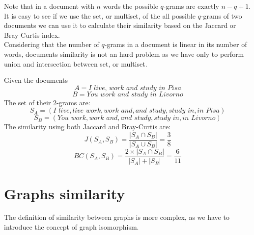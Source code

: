 Note that in a document with $n$ words the possible $q$-grams are exactly $n-q+1$.\\

It is easy to see if we use the set, or multiset, of the all possible $q$-grams of two documents we can use it to calculate their similarity based on the Jaccard or Bray-Curtis index.\\

Considering that the number of $q$-grams in a document is linear in its number of words, documents similarity is not an hard problem as we have only to perform union and intersection between set, or multiset.

\begin{esempio}
	Given the documents 
	\begin{equation*}
	A = \textit{I live, work and study in Pisa}
	\end{equation*}
	\begin{equation*}
	B = \textit{You work and study in Livorno}
	\end{equation*}
	The set of their $2$-grams are:
	\begin{equation*}
	S_{A} = (\textit{I live}, \textit{live work}, \textit{work and}, \textit{and study}, \textit{study in}, \textit{in Pisa})
	\end{equation*}
	\begin{equation*}
	S_{B} = (\textit{You work}, \textit{work and}, \textit{and study}, \textit{study in}, \textit{in Livorno})
	\end{equation*}
	The similarity using both Jaccard and Bray-Curtis are:\\
	\begin{equation*}
		J(S_{A},S_{B}) = \frac{|S_{A} \cap S_{B} |}{|S_{A} \cup S_{B} |} = \frac{3}{8}
	\end{equation*}
	\begin{equation*}
		BC(S_{A},S_{B}) = \frac{2 \times |S_{A} \cap S_{B} |}{|S_{A}| +|S_{B}|} = \frac{6}{11}
	\end{equation*}
\end{esempio}

\section{Graphs similarity}

The definition of similarity between graphs is more complex, as we have to introduce the concept of graph isomorphism.

